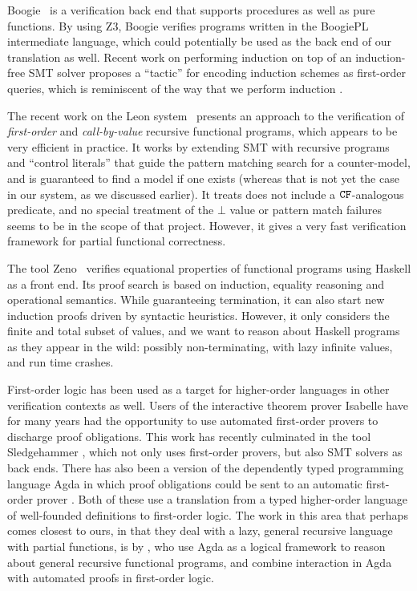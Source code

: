 Boogie~\cite{boogie} is a verification back end that supports procedures as well as
pure functions.  By using Z3, Boogie verifies
programs written in the BoogiePL intermediate language, 
which could potentially be used as the
back end of our translation as well. 
Recent work on performing induction on top of an
induction-free SMT solver proposes a ``tactic''
for encoding induction schemes as first-order queries, which is reminiscent of the way
that we perform induction \cite{Leino:2012:AIS:2189257.2189278}.

The recent work on the Leon system~\cite{Suter:2011:SMR:2041552.2041575} presents
an approach to the verification of {\em first-order} and {\em call-by-value}
recursive functional programs, which appears to be very efficient in practice.  It works
by extending SMT with recursive programs and ``control literals'' that guide the pattern
matching search for a counter-model, and is guaranteed to find a model if one exists
(whereas that is not yet the case in our system, as we discussed earlier). It 
treats does not include
a ${\tt CF}$-analogous predicate, and no special treatment of the $\bot$
value or pattern match failures seems to be in the scope of that project.
However, it gives a very fast verification framework for partial functional correctness.

The tool Zeno~\cite{zeno} verifies equational properties of functional
programs using Haskell as a front end. Its proof search is based on
induction, equality reasoning and operational semantics. While
guaranteeing termination, it can also start new induction proofs
driven by syntactic heuristics. However, it only considers the finite and total
subset of values, and we want to reason about Haskell
programs as they appear in the wild: possibly non-terminating, with
lazy infinite values, and run time crashes.


First-order logic has been used as a target for higher-order languages
in other verification contexts as well.  Users of the interactive
theorem prover Isabelle have for many years had the opportunity to use
automated first-order provers to discharge proof obligations. This
work has recently culminated in the tool
Sledgehammer \cite{Sledgehammer}, which not only uses first-order
provers, but also SMT solvers as back ends.  There has also been a version
of the dependently typed programming language Agda in which proof
obligations could be sent to an automatic first-order
prover \cite{AgdaFOL}. Both of these use a translation from a
typed higher-order language of well-founded definitions to first-order
logic. The work in this area that perhaps comes closest to ours, in
that they deal with a lazy, general recursive language with partial
functions, is by \citet{TypeTheoryFOL}, who use Agda as a logical
framework to reason about general recursive functional programs, and
combine interaction in Agda with automated proofs in first-order
logic.

